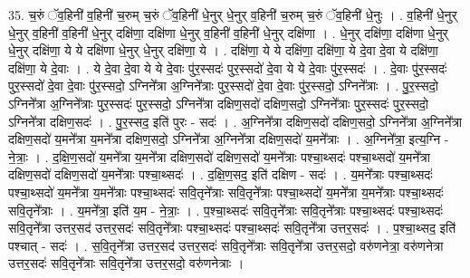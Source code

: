 \documentclass[17pt]{extarticle}
\begin{document}
35. च॒रुं ॅव॒हिनी॑ व॒हिनी॑ च॒रुम् च॒रुं ॅव॒हिनी॑ धे॒नुर् धे॒नुर् व॒हिनी॑ च॒रुम् च॒रुं ॅव॒हिनी॑ धे॒नुः । . व॒हिनी॑ धे॒नुर् धे॒नुर् व॒हिनी॑ व॒हिनी॑ धे॒नुर् दक्षि॑णा॒ दक्षि॑णा धे॒नुर् व॒हिनी॑ व॒हिनी॑ धे॒नुर् दक्षि॑णा । . धे॒नुर् दक्षि॑णा॒ दक्षि॑णा धे॒नुर् धे॒नुर् दक्षि॑णा॒ ये ये दक्षि॑णा धे॒नुर् धे॒नुर् दक्षि॑णा॒ ये । . दक्षि॑णा॒ ये ये दक्षि॑णा॒ दक्षि॑णा॒ ये दे॒वा दे॒वा ये दक्षि॑णा॒ दक्षि॑णा॒ ये दे॒वाः । . ये दे॒वा दे॒वा ये ये दे॒वाः पु॑र॒स्सदः॑ पुर॒स्सदो॑ दे॒वा ये ये दे॒वाः पु॑र॒स्सदः॑ । . दे॒वाः पु॑र॒स्सदः॑ पुर॒स्सदो॑ दे॒वा दे॒वाः पु॑र॒स्सदो॒ ऽग्निने᳚त्रा अ॒ग्निने᳚त्राः पुर॒स्सदो॑ दे॒वा दे॒वाः पु॑र॒स्सदो॒ ऽग्निने᳚त्राः । . पु॒र॒स्सदो॒ ऽग्निने᳚त्रा अ॒ग्निने᳚त्राः पुर॒स्सदः॑ पुर॒स्सदो॒ ऽग्निने᳚त्रा दक्षिण॒सदो॑ दक्षिण॒सदो॒ ऽग्निने᳚त्राः पुर॒स्सदः॑ पुर॒स्सदो॒ ऽग्निने᳚त्रा दक्षिण॒सदः॑ । . पु॒र॒स्सद॒ इति॑ पुरः - सदः॑ । . अ॒ग्निने᳚त्रा दक्षिण॒सदो॑ दक्षिण॒सदो॒ ऽग्निने᳚त्रा अ॒ग्निने᳚त्रा दक्षिण॒सदो॑ य॒मने᳚त्रा य॒मने᳚त्रा दक्षिण॒सदो॒ ऽग्निने᳚त्रा अ॒ग्निने᳚त्रा दक्षिण॒सदो॑ य॒मने᳚त्राः । . अ॒ग्निने᳚त्रा॒ इत्य॒ग्नि - ने॒त्राः॒ । . द॒क्षि॒ण॒सदो॑ य॒मने᳚त्रा य॒मने᳚त्रा दक्षिण॒सदो॑ दक्षिण॒सदो॑ य॒मने᳚त्राः पश्चा॒थ्सदः॑ पश्चा॒थ्सदो॑ य॒मने᳚त्रा दक्षिण॒सदो॑ दक्षिण॒सदो॑ य॒मने᳚त्राः पश्चा॒थ्सदः॑ । . द॒क्षि॒ण॒सद॒ इति॑ दक्षिण - सदः॑ । . य॒मने᳚त्राः पश्चा॒थ्सदः॑ पश्चा॒थ्सदो॑ य॒मने᳚त्रा य॒मने᳚त्राः पश्चा॒थ्सदः॑ सवि॒तृने᳚त्राः सवि॒तृने᳚त्राः पश्चा॒थ्सदो॑ य॒मने᳚त्रा य॒मने᳚त्राः पश्चा॒थ्सदः॑ सवि॒तृने᳚त्राः । . य॒मने᳚त्रा॒ इति॑ य॒म - ने॒त्राः॒ । . प॒श्चा॒थ्सदः॑ सवि॒तृने᳚त्राः सवि॒तृने᳚त्राः पश्चा॒थ्सदः॑ पश्चा॒थ्सदः॑ सवि॒तृने᳚त्रा उत्तर॒सद॑ उत्तर॒सदः॑ सवि॒तृने᳚त्राः पश्चा॒थ्सदः॑ पश्चा॒थ्सदः॑ सवि॒तृने᳚त्रा उत्तर॒सदः॑ । . प॒श्चा॒थ्सद॒ इति॑ पश्चात् - सदः॑ । . स॒वि॒तृने᳚त्रा उत्तर॒सद॑ उत्तर॒सदः॑ सवि॒तृने᳚त्राः सवि॒तृने᳚त्रा उत्तर॒सदो॒ वरु॑णनेत्रा॒ वरु॑णनेत्रा उत्तर॒सदः॑ सवि॒तृने᳚त्राः सवि॒तृने᳚त्रा उत्तर॒सदो॒ वरु॑णनेत्राः । \newline
\end{document}
